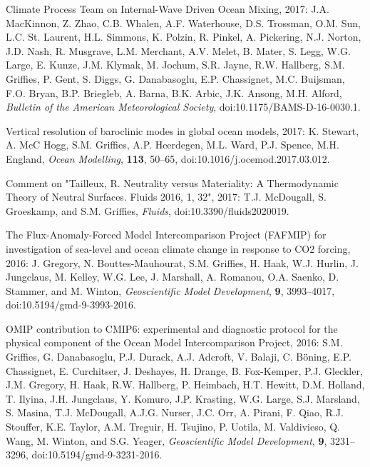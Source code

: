 \begin{etaremune}
\item Climate Process Team on Internal-Wave Driven Ocean Mixing, 2017:  J.A. MacKinnon, Z. Zhao, C.B. Whalen, A.F. Waterhouse, D.S. Trossman, O.M. Sun, L.C. St. Laurent, H.L. Simmons, K. Polzin, R. Pinkel, A. Pickering, N.J. Norton, J.D. Nash, R. Musgrave, L.M. Merchant, A.V. Melet, B. Mater, S. Legg, W.G. Large, E. Kunze, J.M. Klymak,  M. Jochum, S.R. Jayne, R.W. Hallberg, S.M. Grif\/f\/ies, P. Gent, S. Diggs, G. Danabasoglu, E.P. Chassignet, M.C. Buijsman, F.O. Bryan, B.P. Briegleb, A. Barna, B.K. Arbic,  J.K. Ansong, M.H. Alford, {\it Bulletin of the American Meteorological Society}, doi:10.1175/BAMS-D-16-0030.1.

\item Vertical resolution of baroclinic modes in global ocean models,  2017: K. Stewart, A. McC Hogg, S.M. Grif\/f\/ies, A.P. Heerdegen, M.L. Ward, P.J. Spence, M.H. England,  {\it Ocean Modelling}, {\bf 113}, 50--65, doi:10.1016/j.ocemod.2017.03.012.

\item Comment on "Tailleux, R. Neutrality versus Materiality: A Thermodynamic Theory of Neutral Surfaces. Fluids 2016, 1, 32", 2017: T.J. McDougall, S. Groeskamp, and S.M. Grif\/f\/ies, 
{\it Fluids}, doi:10.3390/fluids2020019. 

\item The Flux-Anomaly-Forced Model Intercomparison Project (FAFMIP) for investigation of sea-level and ocean climate change in response to CO2 forcing, 2016: J. Gregory, N. Bouttes-Mauhourat, S.M. Grif\/f\/ies, H. Haak, W.J. Hurlin, J.  Jungclaus, M. Kelley, W.G. Lee, J. Marshall, A. Romanou, O.A. Saenko, D. Stammer, and M.  Winton, {\it Geoscientific Model Development},
  {\bf 9}, 3993--4017, doi:10.5194/gmd-9-3993-2016.






\item OMIP contribution to CMIP6: experimental and diagnostic protocol for the physical component of the Ocean Model Intercomparison  Project, 2016: S.M. Grif\/f\/ies, G. Danabasoglu, P.J. Durack,  A.J. Adcroft, V. Balaji, C. B\"{o}̈ning, E.P. Chassignet, E. Curchitser, J. Deshayes, H. Drange, B. Fox-Kemper, P.J. Gleckler, J.M. Gregory, H. Haak, R.W. Hallberg, P. Heimbach, H.T. Hewitt, D.M. Holland, T. Ilyina, J.H. Jungclaus, Y. Komuro, J.P. Krasting, W.G. Large, S.J. Marsland, S. Masina, T.J. McDougall, A.J.G. Nurser, J.C. Orr, A. Pirani, F. Qiao, R.J. Stouffer, K.E. Taylor, A.M. Treguir, H. Tsujino, P. Uotila, M. Valdivieso, Q. Wang,
M. Winton, and S.G. Yeager, {\it Geoscientific Model Development},
  {\bf 9}, 3231--3296, doi:10.5194/gmd-9-3231-2016.


\end{etaremune}
